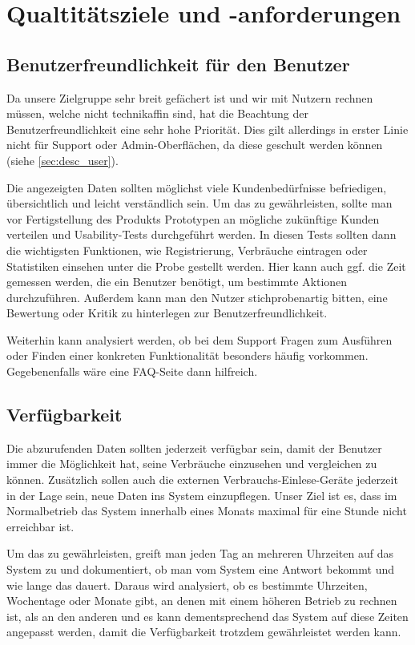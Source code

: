 \section{Qualtitätsziele und -anforderungen}
\label{quality_requirements}

\subsection{Benutzerfreundlichkeit für den Benutzer}
Da unsere Zielgruppe sehr breit gefächert ist und wir mit Nutzern rechnen müssen, welche nicht technikaffin sind,
hat die Beachtung der Benutzerfreundlichkeit eine sehr hohe Priorität.
Dies gilt allerdings in erster Linie nicht für Support oder Admin-Oberflächen, da diese geschult werden können (siehe \ref{sec:desc_user}).

Die angezeigten Daten sollten möglichst viele Kundenbedürfnisse
befriedigen, übersichtlich und leicht verständlich sein.
Um das zu gewährleisten, sollte man vor Fertigstellung des Produkts Prototypen an mögliche zukünftige Kunden verteilen
und Usability-Tests durchgeführt werden.
In diesen Tests sollten dann die wichtigsten Funktionen, wie Registrierung, Verbräuche eintragen oder Statistiken einsehen
unter die Probe gestellt werden.
Hier kann auch ggf. die Zeit gemessen werden, die ein Benutzer benötigt, um bestimmte Aktionen durchzuführen.
Außerdem kann man den Nutzer stichprobenartig bitten, eine Bewertung oder Kritik zu hinterlegen zur Benutzerfreundlichkeit.

Weiterhin kann analysiert werden, ob bei dem Support Fragen zum Ausführen oder Finden einer konkreten Funktionalität
besonders häufig vorkommen.
Gegebenenfalls wäre eine FAQ-Seite dann hilfreich.

\subsection{Verfügbarkeit}
Die abzurufenden Daten sollten jederzeit verfügbar sein,
damit der Benutzer immer die Möglichkeit hat,
seine Verbräuche einzusehen und vergleichen zu können.
Zusätzlich sollen auch die externen Verbrauchs-Einlese-Geräte jederzeit in der Lage sein, neue Daten ins System
einzupflegen.
Unser Ziel ist es, dass im Normalbetrieb das System innerhalb eines Monats maximal für eine Stunde nicht erreichbar ist.

Um das zu gewährleisten, greift man jeden Tag an mehreren Uhrzeiten auf das System zu
und dokumentiert, ob man vom System eine Antwort bekommt und wie lange das dauert.
Daraus wird analysiert, ob es bestimmte Uhrzeiten, Wochentage oder Monate gibt,
an denen mit einem höheren Betrieb zu rechnen ist, als an den anderen und es kann dementsprechend das
System auf diese Zeiten angepasst werden, damit die Verfügbarkeit trotzdem gewährleistet werden kann.

